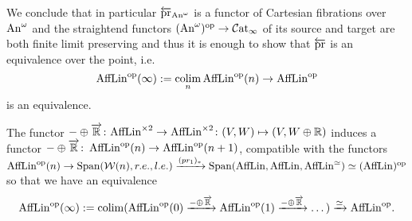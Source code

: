     We conclude that in particular $\overleftarrow{\pr}_{\An^\omega}$ is a functor of Cartesian fibrations over $\An^\omega$
    and the straightend functors $(\An^\omega)^\op \to \catinfty$ of its source and target 
    are both finite limit preserving 
    and thus it is enough to show that $\overleftarrow{\pr}$ is an equivalence over the point, i.e.
    \[ 
        \AffLin^\op(\infty) := \colim_n \AffLin^\op(n) \to \AffLin^\op
    \]
    is an equivalence. 

  \begin{lemma}\label{colimitlemma}
    The functor $-\oplus \overrightarrow{\R} \colon {\cO}^{\times 2} \to {\cO}^{\times 2}
      \colon (V,W) \mapsto (V, W\oplus \R)$ induces a functor
    $-\oplus \overrightarrow{\R} \colon \cO^\op(n)\to \cO^\op(n+1)$,
    compatible with the functors
    $\cO^\op(n) \to \Span({\mathcal W(n)}, r.e., l.e. ) \xto{(pr_1)_*} \Span(\cO,
      {\cO}, {\cO}^\simeq) \simeq ({\cO})^\op$
    so that we have an equivalence
    \[
      \AffLin^\op(\infty) := \colim (\cO^\op(0) \xto{-\oplus \overrightarrow{\R}} \cO^\op(1)
      \xto{-\oplus \overrightarrow{\R}} \dots) \xrightarrow{\simeq} {\cO}^\op 
      .\]
  \end{lemma}
